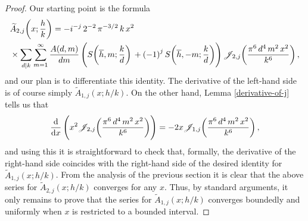 \documentclass[a4paper,10pt,twoside]{amsart}
\theoremstyle{definition}
\numberwithin{equation}{section}
\renewcommand\:{\colon}
\begin{document}
\begin{proof}
Our starting point is the formula
\begin{align*}
&\widetilde A_{2,j}\!\left(x;\frac hk\right)
=-i^{-j}\,2^{-2}\,\pi^{-3/2}\,k\,x^2\\&\times
\sum_{d\mid k}\sum_{m=1}^\infty\frac{A(d,m)}{dm}\left(S\!\left(\overline h,m;\frac kd\right)\vphantom{\Bigg|}+\left(-1\right)^jS\!\left(\overline h,-m;\frac kd\right)\right)\mathscr J_{2,j}\!\left(\frac{\pi^6\,d^4\,m^2\,x^2}{k^6}\right),
\end{align*}
and our plan is to differentiate this identity. The derivative of the left-hand side is of course simply $\widetilde A_{1,j}(x;h/k)$. On the other hand, Lemma \ref{derivative-of-j} tells us that
\[\frac{\mathrm d}{\mathrm dx}\left(x^2\vphantom{\Bigg|}\mathscr J_{2,j}\!\left(\frac{\pi^6\,d^4\,m^2\,x^2}{k^6}\right)\right)=-2x\mathscr J_{1,j}\!\left(\frac{\pi^6\,d^4\,m^2\,x^2}{k^6}\right),\]
and using this it is straightforward to check that, formally, the derivative of the right-hand side coincides with the right-hand side of the desired identity for $\widetilde A_{1,j}(x;h/k)$. From the analysis of the previous section it is clear that the above series for $\widetilde A_{2,j}(x;h/k)$ converges for any $x$. Thus, by standard arguments, it only remains to prove that the series for $\widetilde A_{1,j}(x;h/k)$ converges boundedly and uniformly when $x$ is restricted to a bounded interval.


\end{proof}
\end{document}

